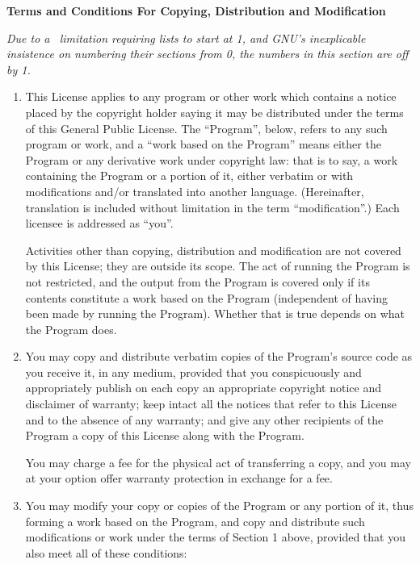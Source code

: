 {\medskip\noindent\normalsize\textbf{Terms and Conditions For Copying, Distribution and Modification}}
{\scriptsize

\begin{multicols}{2}

\ifhevea \emph{Due to a \hevea\ limitation requiring lists to start at 1, and 
GNU's inexplicable insistence on numbering their sections from 0, the numbers in 
this section are off by 1.}\fi

\begin{enumerate}

\ifhevea\else\addtocounter{enumi}{-1}\fi

\item
This License applies to any program or other work which contains a notice
placed by the copyright holder saying it may be distributed under the
terms of this General Public License.  The ``Program'', below, refers to
any such program or work, and a ``work based on the Program'' means either
the Program or any derivative work under copyright law: that is to say, a
work containing the Program or a portion of it, either verbatim or with
modifications and/or translated into another language.  (Hereinafter,
translation is included without limitation in the term ``modification''.)
Each licensee is addressed as ``you''.

Activities other than copying, distribution and modification are not
covered by this License; they are outside its scope.  The act of
running the Program is not restricted, and the output from the Program
is covered only if its contents constitute a work based on the
Program (independent of having been made by running the Program).
Whether that is true depends on what the Program does.

\item
You may copy and distribute verbatim copies of the Program's source code as you 
receive it, in any medium, provided that you conspicuously and appropriately 
publish on each copy an appropriate copyright notice and disclaimer of warranty; 
keep intact all the notices that refer to this License and to the absence of any 
warranty; and give any other recipients of the Program a copy of this License 
along with the Program.

You may charge a fee for the physical act of transferring a copy, and you
may at your option offer warranty protection in exchange for a fee.

\item
You may modify your copy or copies of the Program or any portion
of it, thus forming a work based on the Program, and copy and
distribute such modifications or work under the terms of Section 1
above, provided that you also meet all of these conditions:


\end{enumerate}
\end{multicols}}

